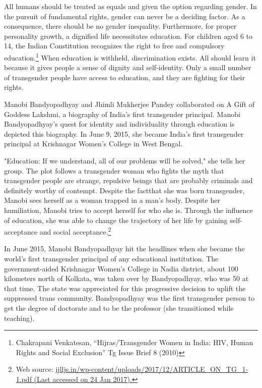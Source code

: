 \begin{multicols}{2}

\noi
All humans should be treated as equals and given the option regarding gender. In the pursuit
of fundamental rights, gender can never be a deciding factor. As a consequence, there should
be no gender inequality. Furthermore, for proper personality growth, a dignified life
necessitates education. For children aged 6 to 14, the Indian Constitution recognizes the right to free and compulsory education.\footnote{Chakrapani Venkatesan, “Hijras/Transgender Women in India: HIV, Human Rights and Social Exclusion” Tg Issue Brief 8 (2010)} When education is withheld, discrimination exists. All should learn it because it gives people a sense of dignity and self-identity. Only a small number of transgender people have access to education, and they are fighting for their rights.

\noi
Manobi Bandyopadhyay and Jhimli Mukherjee Pandey collaborated on A Gift of Goddess
Lakshmi, a biography of India's first transgender principal. Manobi Bandyopadhyay's quest for
identity and individuality through education is depicted this biography. In June 9, 2015, she
became India's first transgender principal at Krishnagar Women's College in West Bengal.

\noi
"Education: If we understand, all of our problems will be solved," she tells her group. The plot
follows a transgender woman who fights the myth that transgender people are strange, repulsive
beings that are probably criminals and definitely worthy of contempt. Despite the factthat she
was born transgender, Manobi sees herself as a woman trapped in a man's body. Despite her
humiliation, Manobi tries to accept herself for who she is. Through the influence of education,
she was able to change the trajectory of her life by gaining self-acceptance and social
acceptance.\footnote{Web source: \url{ijlljs.in/wp-content/uploads/2017/12/ARTICLE_ON_TG_1-1.pdf (Last accessed on 24 Jan 2017).}}

\noi
In June 2015, Manobi Bandyopadhyay hit the headlines when she became the world's first
transgender principal of any educational institution. The government-aided Krishnagar
Women's College in Nadia district, about 100 kilometers north of Kolkata, was taken over by
Bandyopadhyay, who was 50 at that time. The state was appreciated for this progressive
decision to uplift the suppressed trans community. Bandyopadhyay was the first transgender
person to get the degree of doctorate and to be the professor (she transitioned while teaching).


\end{multicols}
